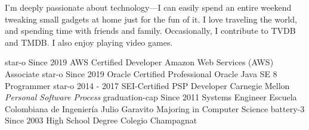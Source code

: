 \documentclass[icon]{twentysecondcv}
\begin{document}
I'm deeply passionate about technology—I can easily spend an entire weekend tweaking small gadgets at home just for the fun of it. I love traveling the world, and spending time with friends and family. Occasionally, I contribute to TVDB and TMDB. I also enjoy playing video games.
\begin{twentyicon}
  \twentyitemicon
    {star-o}
    {Since 2019}
    {AWS Certified Developer}
    {Amazon Web Services (AWS)}
    {Associate}
  \twentyitemicon
    {star-o}
    {Since 2019}
    {Oracle Certified Professional}
    {Oracle}
    {Java SE 8 Programmer}
  \twentyitemicon
    {star-o}
    {2014 - 2017}
    {SEI-Certified PSP Developer}
    {Carnegie Mellon}
    {\emph{Personal Software Process}}
  \twentyitemicon
    {graduation-cap}
    {Since 2011}
    {Systems Engineer}
    {Escuela Colombiana de Ingenier\'ia  Julio Garavito}
    {Majoring in Computer Science}
  \twentyitemicon
    {battery-3}
    {Since 2003}
    {High School Degree}
    {Colegio Champagnat}
    {}
\end{twentyicon}


\end{document}
